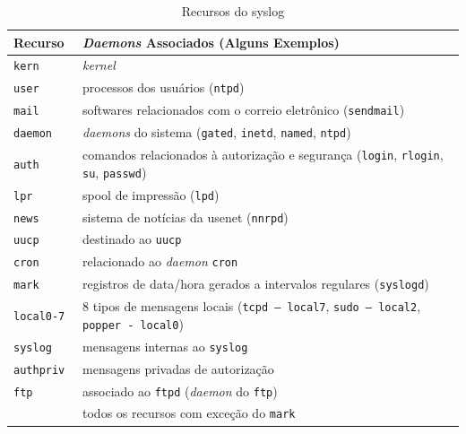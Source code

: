 \begin{table}
\begin{center}
  \caption{Recursos do {\ttfamily syslog}}
  \label{tab:outro}
  \small
  \begin{tabular}{l|p{9cm}}
    \hline
    \rowcolor[gray]{.9}
    \bf Recurso & \bf {\em Daemons} Associados (Alguns Exemplos) \\
    \hline
    \hline
    \tt kern & \em kernel  \\
    \tt user & processos dos usuários ({\tt ntpd}) \\
    \tt mail & softwares relacionados com o correio eletrônico ({\tt sendmail})\\
    \tt daemon & {\em daemons} do sistema ({\tt gated}, {\tt inetd}, 
    {\tt named}, {\tt ntpd})\\
    \tt auth &  comandos relacionados à autorização e segurança 
    ({\tt login}, {\tt rlogin}, {\tt su}, {\tt passwd}) \\
    \tt lpr & spool de impressão ({\tt lpd})\\
    \tt news & sistema de notícias da usenet ({\tt nnrpd})\\
    \tt uucp & destinado ao {\tt uucp}\\
    \tt cron & relacionado ao {\em daemon} {\tt cron}\\
    \tt mark &  registros de data/hora gerados a intervalos regulares 
    ({\tt syslogd})\\
    \tt local0-7 & 8 tipos de mensagens locais \newline
    ({\tt tcpd -- local7}, {\tt sudo -- local2}, {\tt popper - local0}) \\
    \tt syslog &  mensagens internas ao {\tt syslog}\\
    \tt authpriv & mensagens privadas de autorização\\
    \tt ftp & associado ao {\tt ftpd} ({\em daemon} do {\tt ftp}) \\
    \tt * &  todos os recursos com exceção do {\tt mark}\\
    \hline
  \end{tabular}
\end{center}
\end{table}

